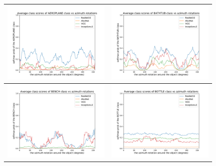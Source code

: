\begin{figure}[h]
\centering
\tabcolsep=0.03cm
   \begin{tabular}{c|c}
\includegraphics[width = 9cm]{supimages/nms1d/average_azimuth_performance_AEROPLANE.pdf}&
\includegraphics[width = 9cm]{supimages/nms1d/average_azimuth_performance_BATHTUB.pdf}\\ \hline
\includegraphics[width = 9cm]{supimages/nms1d/average_azimuth_performance_BENCH.pdf}&
\includegraphics[width = 9cm]{supimages/nms1d/average_azimuth_performance_BOTTLE.pdf}

\end{tabular}
\end{figure}
